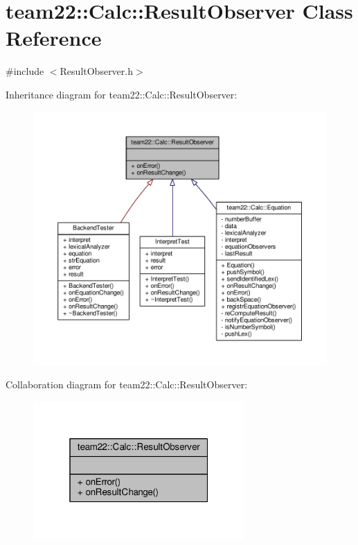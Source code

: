 \hypertarget{classteam22_1_1_calc_1_1_result_observer}{}\section{team22\+:\+:Calc\+:\+:Result\+Observer Class Reference}
\label{classteam22_1_1_calc_1_1_result_observer}


{\ttfamily \#include $<$Result\+Observer.\+h$>$}



Inheritance diagram for team22\+:\+:Calc\+:\+:Result\+Observer\+:
\nopagebreak
\begin{figure}[H]
\begin{center}
\leavevmode
\includegraphics[width=350pt]{classteam22_1_1_calc_1_1_result_observer__inherit__graph}
\end{center}
\end{figure}


Collaboration diagram for team22\+:\+:Calc\+:\+:Result\+Observer\+:
\nopagebreak
\begin{figure}[H]
\begin{center}
\leavevmode
\includegraphics[width=229pt]{classteam22_1_1_calc_1_1_result_observer__coll__graph}
\end{center}
\end{figure}
